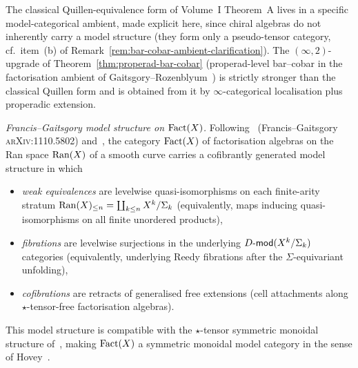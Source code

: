 \begin{remark}
\label{rem:model-structure-ambient-for-bar-cobar}
The classical Quillen-equivalence form of Volume~I Theorem~A lives
in a specific model-categorical ambient, made explicit here,
since chiral algebras do not inherently carry a model structure
(they form only a pseudo-tensor category, cf.\ item~(b) of
Remark~\ref{rem:bar-cobar-ambient-clarification}). The
$(\infty,2)$-upgrade of Theorem~\ref{thm:properad-bar-cobar}
(properad-level bar--cobar in the factorisation ambient of
Gaitsgory--Rozenblyum~\cite[IV.5]{GR17}) is strictly stronger than
the classical Quillen form and is obtained from it by
$\infty$-categorical localisation plus properadic extension.

\smallskip
\noindent\emph{Francis--Gaitsgory model structure on $\mathrm{Fact}(X)$.}
Following~\cite[\S 2-3]{FG12} (Francis--Gaitsgory
\textsc{arXiv}:1110.5802) and~\cite[IV.5.3]{GR17}, the category
$\mathrm{Fact}(X)$ of factorisation algebras on the Ran space $\mathrm{Ran}(X)$
of a smooth curve carries a cofibrantly generated model structure
in which
\begin{itemize}
\item \emph{weak equivalences} are levelwise quasi-isomorphisms on
 each finite-arity stratum
 $\mathrm{Ran}(X)_{\leq n} = \coprod_{k\leq n} X^k / \Sigma_k$ (equivalently,
 maps inducing quasi-isomorphisms on all finite unordered
 products),
\item \emph{fibrations} are levelwise surjections in the underlying
 $D\text{-}\mathsf{mod}(X^k/\Sigma_k)$ categories (equivalently, underlying
 Reedy fibrations after the $\Sigma$-equivariant unfolding),
\item \emph{cofibrations} are retracts of generalised free
 extensions (cell attachments along $\star$-tensor-free
 factorisation algebras).
\end{itemize}
This model structure is compatible with the $\star$-tensor
symmetric monoidal structure of~\cite[IV.5.2]{GR17}, making
$\mathrm{Fact}(X)$ a symmetric monoidal model category in the sense
of Hovey~\cite[Definition~4.2.6]{Hovey99}.


\end{remark}
